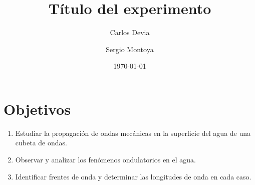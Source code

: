 \documentclass[a4paper, amsfonts, amssymb, amsmath, reprint, showkeys, nofootinbib, twoside]{revtex4-1}
\begin{document}
\title{Título del experimento}


\author{Carlos Devia}

  
\author{Sergio Montoya}


\date{\today} %

\begin{abstract}
\end{abstract}

\maketitle

\section{Objetivos}
\begin{enumerate}
  \item Estudiar la propagación de ondas mecánicas en la superficie del agua de una cubeta de ondas.
  \item Observar y analizar los fenómenos ondulatorios en el agua.
  \item Identificar frentes de onda y determinar las longitudes de onda en cada caso.
\end{enumerate}
\end{document}
